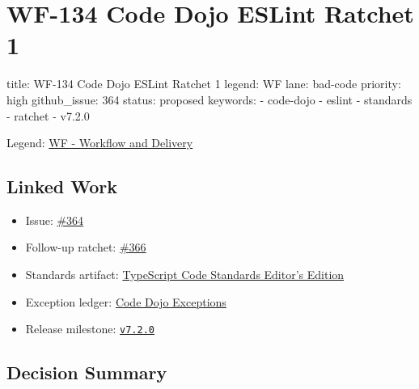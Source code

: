 \chapter{WF-134 Code Dojo ESLint Ratchet 1}\label{record-216}

\smallskip

\begin{RecordMeta}
title: WF-134 Code Dojo ESLint Ratchet 1
legend: WF
lane: bad-code
priority: high
github_issue: 364
status: proposed
keywords:
  - code-dojo
  - eslint
  - standards
  - ratchet
  - v7.2.0

\end{RecordMeta}

Legend: \href{https://github.com/flyingrobots/bijou/blob/cbd70612140e7a450d764b3c7be1c6af878b99bc/docs/legends/WF-workflow-delivery.md}{WF - Workflow and Delivery}

\section{Linked Work}\label{record-216-linked-work}

\begin{itemize}
\tightlist
\item
  Issue: \href{https://github.com/flyingrobots/bijou/issues/364}{\#364}
\item
  Follow-up ratchet: \href{https://github.com/flyingrobots/bijou/issues/366}{\#366}
\item
  Standards artifact: \href{https://github.com/flyingrobots/bijou/blob/cbd70612140e7a450d764b3c7be1c6af878b99bc/docs/typescript-code-standards.editors-edition.md}{TypeScript Code Standards Editor's Edition}
\item
  Exception ledger: \href{https://github.com/flyingrobots/bijou/blob/cbd70612140e7a450d764b3c7be1c6af878b99bc/docs/code-dojo-exceptions.md}{Code Dojo Exceptions}
\item
  Release milestone: \href{https://github.com/flyingrobots/bijou/milestone/5}{\texttt{v\allowbreak{}7\allowbreak{}.\allowbreak{}2\allowbreak{}.\allowbreak{}0}}
\end{itemize}

\section{Decision Summary}\label{record-216-decision-summary}

